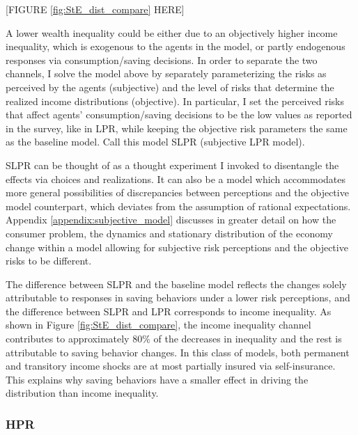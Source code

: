 \begin{center}
[FIGURE \ref{fig:StE_dist_compare} HERE]
\end{center}

A lower wealth inequality could be either due to an objectively higher income inequality, which is exogenous to the agents in the model, or partly endogenous responses via consumption/saving decisions. In order to separate the two channels, I solve the model above by separately parameterizing the risks as perceived by the agents (subjective) and the level of risks that determine the realized income distributions (objective). In particular, I set the perceived risks that affect agents' consumption/saving decisions to be the low values as reported in the survey, like in LPR, while keeping the objective risk parameters the same as the baseline model. Call this model SLPR (subjective LPR model). %

SLPR can be thought of as a thought experiment I invoked to disentangle the effects via choices and realizations. It can also be a model which accommodates more general possibilities of discrepancies between perceptions and the objective model counterpart,  which deviates from the assumption of rational expectations. Appendix \ref{appendix:subjective_model} discusses in greater detail on how the consumer problem, the dynamics and stationary distribution of the economy change within a model allowing for subjective risk perceptions and the objective risks to be different. 


The difference between SLPR and the baseline model reflects the changes solely attributable to responses in saving behaviors under a lower risk perceptions, and the difference between SLPR and LPR corresponds to income inequality. As shown in Figure \ref{fig:StE_dist_compare}, the income inequality channel contributes to approximately 80\% of the decreases in inequality and the rest is attributable to saving behavior changes. In this class of models, both permanent and transitory income shocks are at most partially insured via self-insurance. This explains why saving behaviors have a smaller effect in driving the distribution than income inequality. 


\subsubsection{HPR}

